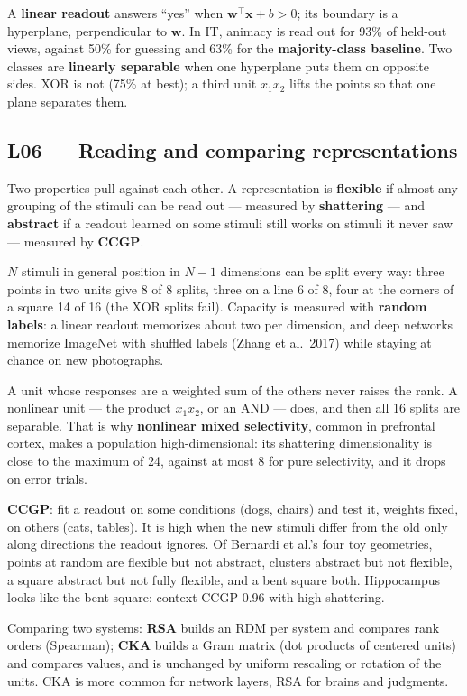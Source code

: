 \documentclass[11pt]{article}
\begin{document}
A \textbf{linear readout} answers ``yes'' when $\mathbf{w}^\top\mathbf{x}+b>0$;
its boundary is a hyperplane, perpendicular to $\mathbf{w}$. In IT, animacy is
read out for 93\% of held-out views, against 50\% for guessing and 63\% for the
\textbf{majority-class baseline}. Two classes are \textbf{linearly separable}
when one hyperplane puts them on opposite sides. XOR is not (75\% at best); a
third unit $x_1x_2$ lifts the points so that one plane separates them.

\subsection{L06 --- Reading and comparing representations}

Two properties pull against each other. A representation is \textbf{flexible}
if almost any grouping of the stimuli can be read out --- measured by
\textbf{shattering} --- and \textbf{abstract} if a readout learned on some
stimuli still works on stimuli it never saw --- measured by \textbf{CCGP}.

$N$ stimuli in general position in $N-1$ dimensions can be split every way:
three points in two units give 8 of 8 splits, three on a line 6 of 8, four at
the corners of a square 14 of 16 (the XOR splits fail). Capacity is measured
with \textbf{random labels}: a linear readout memorizes about two per dimension,
and deep networks memorize ImageNet with shuffled labels (Zhang et al.\ 2017)
while staying at chance on new photographs.

A unit whose responses are a weighted sum of the others never raises the rank.
A nonlinear unit --- the product $x_1x_2$, or an AND --- does, and then all 16
splits are separable. That is why \textbf{nonlinear mixed selectivity}, common in
prefrontal cortex, makes a population high-dimensional: its shattering
dimensionality is close to the maximum of 24, against at most 8 for pure
selectivity, and it drops on error trials.

\textbf{CCGP}: fit a readout on some conditions (dogs, chairs) and test it,
weights fixed, on others (cats, tables). It is high when the new stimuli differ
from the old only along directions the readout ignores. Of Bernardi et al.'s
four toy geometries, points at random are flexible but not abstract, clusters
abstract but not flexible, a square abstract but not fully flexible, and a bent
square both. Hippocampus looks like the bent square: context CCGP 0.96 with high
shattering.

Comparing two systems: \textbf{RSA} builds an RDM per system and compares rank
orders (Spearman); \textbf{CKA} builds a Gram matrix (dot products of centered
units) and compares values, and is unchanged by uniform rescaling or rotation of
the units. CKA is more common for network layers, RSA for brains and judgments.
\end{document}
